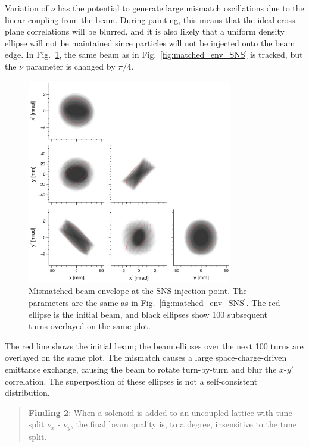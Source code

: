 %
Variation of $\nu$ has the potential to generate large mismatch oscillations due to the linear coupling from the beam. During painting, this means that the ideal cross-plane correlations will be blurred, and it is also likely that a uniform density ellipse will not be maintained since particles will not be injected onto the beam edge. In Fig.~\ref{fig:mismatched_env_SNS}, the same beam as in Fig.~\ref{fig:matched_env_SNS} is tracked, but the $\nu$ parameter is changed by $\pi / 4$. 
%
\begin{figure}[!p]
    \centering
    \includegraphics[width=0.8\textwidth]{Images/chapter2/mismatched_env_SNS.png}
    \caption{Mismatched beam envelope at the SNS injection point. The parameters are the same as in Fig.~\ref{fig:matched_env_SNS}. The red ellipse is the initial beam, and black ellipses show 100 subsequent turns overlayed on the same plot.}
    \label{fig:mismatched_env_SNS}
\end{figure}
%
The red line shows the initial beam; the beam ellipses over the next 100 turns are overlayed on the same plot. The mismatch causes a large space-charge-driven emittance exchange, causing the beam to rotate turn-by-turn and blur the $x$-$y'$ correlation. The superposition of these ellipses is not a self-consistent distribution.
%
\begin{quote}
    \textbf{Finding 2}: When a solenoid is added to an uncoupled lattice with tune split $\nu_x$ - $\nu_y$, the final beam quality is, to a degree, insensitive to the tune split. 
\end{quote}
%
